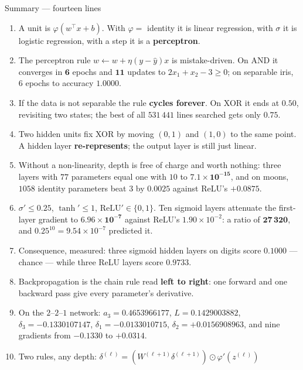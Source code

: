 \documentclass[aspectratio=169]{beamer}
\begin{document}
\begin{frame}[shrink=24]{Summary --- fourteen lines}
  \begin{enumerate}\small
    \item A unit is $\varphi(w^\top x + b)$. With $\varphi = $ identity it is
      linear regression, with $\sigma$ it is logistic regression, with a step
      it is a \textbf{perceptron}.
    \item The perceptron rule $w \leftarrow w + \eta(y-\hat y)x$ is
      mistake-driven. On AND it converges in $\mathbf{6}$ epochs and
      $\mathbf{11}$ updates to $2x_1 + x_2 - 3 \ge 0$; on separable iris, $6$
      epochs to accuracy $1.0000$.
    \item If the data is not separable the rule \textbf{cycles forever}. On
      XOR it ends at $0.50$, revisiting two states; the best of all $531\,441$
      lines searched gets only $\mathbf{0.75}$.
    \item Two hidden units fix XOR by moving $(0,1)$ and $(1,0)$ to the same
      point. A hidden layer \textbf{re-represents}; the output layer is still
      just linear.
    \item Without a non-linearity, depth is free of charge and worth nothing:
      three layers with $77$ parameters equal one with $10$ to
      $\mathbf{7.1\times10^{-15}}$, and on moons, $1058$ identity parameters
      beat $3$ by $0.0025$ against ReLU's $+0.0875$.
    \item $\sigma' \le \mathbf{0.25}$, $\tanh' \le 1$, $\mathrm{ReLU}' \in
      \{0,1\}$. Ten sigmoid layers attenuate the first-layer gradient to
      $\mathbf{6.96\times10^{-7}}$ against ReLU's $1.90\times10^{-2}$: a ratio
      of $\mathbf{27\,320}$, and $0.25^{10} = 9.54\times10^{-7}$ predicted it.
    \item Consequence, measured: three sigmoid hidden layers on digits score
      $\mathbf{0.1000}$ --- chance --- while three ReLU layers score
      $0.9733$.
    \item Backpropagation is the chain rule read \textbf{left to right}: one
      forward and one backward pass give every parameter's derivative.
    \item On the $2$--$2$--$1$ network: $a_3 = 0.4653966177$,
      $L = \mathbf{0.1429003882}$, $\delta_3 = -0.1330107147$,
      $\delta_1 = -0.0133010715$, $\delta_2 = +0.0156908963$, and nine
      gradients from $-0.1330$ to $+0.0314$.
    \item Two rules, any depth:
      $\delta^{(\ell)} = (W^{(\ell+1)}\delta^{(\ell+1)})\odot\varphi'(z^{(\ell)})$

\end{enumerate}
\end{frame}
\end{document}
